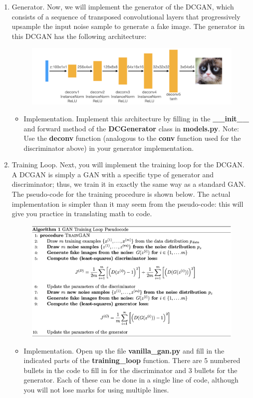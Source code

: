 \documentclass[]{article}
\begin{document}
\begin{enumerate}
\begin{itemize}
        \end{itemize}
    \item Generator. Now, we will implement the generator of the DCGAN, which consists of a sequence of transposed convolutional layers that progressively upsample the input noise sample to generate a fake image. The generator in this DCGAN has the following architecture:
    \begin{figure}[h]
        \centering
        \includegraphics[width=0.9\linewidth]{gene.png}
    \end{figure}
    \begin{itemize}
        \item Implementation. Implement this architecture by filling in the \textbf{\_\_init\_\_} and forward method of the \textbf{DCGenerator} class in \textbf{models.py}. Note: Use the \textbf{deconv} function (analogous to the \textbf{conv} function used for the discriminator above) in your generator implementation.
    \end{itemize}
    \item Training Loop. Next, you will implement the training loop for the DCGAN. A DCGAN is simply a GAN with a specific type of generator and discriminator; thus, we train it in exactly the same way as a standard GAN. The pseudo-code for the training procedure is shown below. The actual implementation is simpler than it may seem from the pseudo-code: this will give you practice in translating math to code. 
    \begin{figure}[h]
        \centering
        \includegraphics[width=0.9\linewidth]{pseudo.png}
    \end{figure}
    \begin{itemize}
        \item Implementation. Open up the file \textbf{vanilla\_gan.py }and fill in the indicated parts of the \textbf{training\_loop} function. There are 5 numbered bullets in the code to fill in for the discriminator and 3 bullets for the generator. Each of these can be done in a single line of code, although you will not lose marks for using multiple lines.
    \end{itemize}


\end{enumerate}
\end{document}
